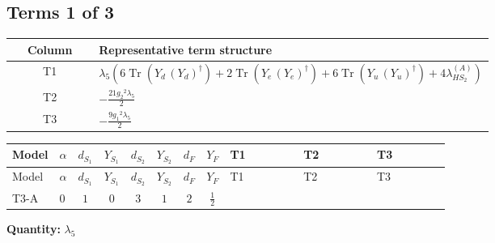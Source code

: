 \documentclass[8pt]{article}
\begin{document}
\begin{landscape}
\subsection*{Terms 1 of 3}
\begin{center}
\begin{tabular}{@{}c >{\raggedright\arraybackslash}p{0.82\linewidth}@{}}
\toprule
Column & Representative term structure \\
\midrule
T1 & \(\displaystyle {\lambda_5} (6 \operatorname{Tr}\!\left({Y_d}\,\left({Y_d}\right)^{\dagger}\right)+2 \operatorname{Tr}\!\left({Y_e}\,\left({Y_e}\right)^{\dagger}\right)+6 \operatorname{Tr}\!\left({Y_u}\,\left({Y_u}\right)^{\dagger}\right)+4 {\lambda_{HS_2}^{(A)}})\) \\
\midrule
T2 & \(\displaystyle -\frac{21 {g_2}^2 {\lambda_5}}{2}\) \\
\midrule
T3 & \(\displaystyle -\frac{9 {g_1}^2 {\lambda_5}}{2}\) \\
\midrule
\bottomrule
\end{tabular}
\end{center}
\smallskip
\tiny
\begin{longtable}{@{}llcccccc >{\raggedright\arraybackslash}p{0.21\linewidth} >{\raggedright\arraybackslash}p{0.21\linewidth} >{\raggedright\arraybackslash}p{0.21\linewidth}@{}}
\toprule
Model & $\alpha$ & $d_{S_1}$ & $Y_{S_1}$ & $d_{S_2}$ & $Y_{S_2}$ & $d_F$ & $Y_F$ & T1 & T2 & T3 \\
\midrule
\endfirsthead
\toprule
Model & $\alpha$ & $d_{S_1}$ & $Y_{S_1}$ & $d_{S_2}$ & $Y_{S_2}$ & $d_F$ & $Y_F$ & T1 & T2 & T3 \\
\midrule
\endhead
T3-A & $0$ & $1$ & $0$ & $3$ & $1$ & $2$ & $\frac{1}{2}$ & \scriptsize\adjustbox{max width=\linewidth}{$\begin{gathered} {\lambda_5} (6 \operatorname{Tr}\!\left({Y_d}\,\left({Y_d}\right)^{\dagger}\right)+2 \operatorname{Tr}\!\left({Y_e}\,\left({Y_e}\right)^{\dagger}\right)+6 \operatorname{Tr}\!\left({Y_u}\,\left({Y_u}\right)^{\dagger}\right)+4 {\lambda_{HS_2}^{(A)}})\end{gathered}$} & \scriptsize\adjustbox{max width=\linewidth}{$\begin{gathered} -\frac{21 {g_2}^2 {\lambda_5}}{2}\end{gathered}$} & \scriptsize\adjustbox{max width=\linewidth}{$\begin{gathered} -\frac{9 {g_1}^2 {\lambda_5}}{2}\end{gathered}$} \\
\midrule
\bottomrule
\end{longtable}
\clearpage
\noindent\textbf{Quantity: }$\lambda_5$\par\smallskip

\end{landscape}
\end{document}
